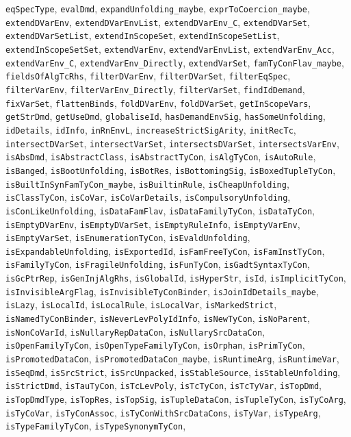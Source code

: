 \texttt{eqSpecType}, \texttt{evalDmd}, \texttt{expandUnfolding_maybe}, \texttt{exprToCoercion_maybe}, \texttt{extendDVarEnv}, \texttt{extendDVarEnvList}, \texttt{extendDVarEnv_C}, \texttt{extendDVarSet}, \texttt{extendDVarSetList}, \texttt{extendInScopeSet}, \texttt{extendInScopeSetList}, \texttt{extendInScopeSetSet}, \texttt{extendVarEnv}, \texttt{extendVarEnvList}, \texttt{extendVarEnv_Acc}, \texttt{extendVarEnv_C}, \texttt{extendVarEnv_Directly}, \texttt{extendVarSet}, \texttt{famTyConFlav_maybe}, \texttt{fieldsOfAlgTcRhs}, \texttt{filterDVarEnv}, \texttt{filterDVarSet}, \texttt{filterEqSpec}, \texttt{filterVarEnv}, \texttt{filterVarEnv_Directly}, \texttt{filterVarSet}, \texttt{findIdDemand}, \texttt{fixVarSet}, \texttt{flattenBinds}, \texttt{foldDVarEnv}, \texttt{foldDVarSet}, \texttt{getInScopeVars}, \texttt{getStrDmd}, \texttt{getUseDmd}, \texttt{globaliseId}, \texttt{hasDemandEnvSig}, \texttt{hasSomeUnfolding}, \texttt{idDetails}, \texttt{idInfo}, \texttt{inRnEnvL}, \texttt{increaseStrictSigArity}, \texttt{initRecTc}, \texttt{intersectDVarSet}, \texttt{intersectVarSet}, \texttt{intersectsDVarSet}, \texttt{intersectsVarEnv}, \texttt{isAbsDmd}, \texttt{isAbstractClass}, \texttt{isAbstractTyCon}, \texttt{isAlgTyCon}, \texttt{isAutoRule}, \texttt{isBanged}, \texttt{isBootUnfolding}, \texttt{isBotRes}, \texttt{isBottomingSig}, \texttt{isBoxedTupleTyCon}, \texttt{isBuiltInSynFamTyCon_maybe}, \texttt{isBuiltinRule}, \texttt{isCheapUnfolding}, \texttt{isClassTyCon}, \texttt{isCoVar}, \texttt{isCoVarDetails}, \texttt{isCompulsoryUnfolding}, \texttt{isConLikeUnfolding}, \texttt{isDataFamFlav}, \texttt{isDataFamilyTyCon}, \texttt{isDataTyCon}, \texttt{isEmptyDVarEnv}, \texttt{isEmptyDVarSet}, \texttt{isEmptyRuleInfo}, \texttt{isEmptyVarEnv}, \texttt{isEmptyVarSet}, \texttt{isEnumerationTyCon}, \texttt{isEvaldUnfolding}, \texttt{isExpandableUnfolding}, \texttt{isExportedId}, \texttt{isFamFreeTyCon}, \texttt{isFamInstTyCon}, \texttt{isFamilyTyCon}, \texttt{isFragileUnfolding}, \texttt{isFunTyCon}, \texttt{isGadtSyntaxTyCon}, \texttt{isGcPtrRep}, \texttt{isGenInjAlgRhs}, \texttt{isGlobalId}, \texttt{isHyperStr}, \texttt{isId}, \texttt{isImplicitTyCon}, \texttt{isInvisibleArgFlag}, \texttt{isInvisibleTyConBinder}, \texttt{isJoinIdDetails_maybe}, \texttt{isLazy}, \texttt{isLocalId}, \texttt{isLocalRule}, \texttt{isLocalVar}, \texttt{isMarkedStrict}, \texttt{isNamedTyConBinder}, \texttt{isNeverLevPolyIdInfo}, \texttt{isNewTyCon}, \texttt{isNoParent}, \texttt{isNonCoVarId}, \texttt{isNullaryRepDataCon}, \texttt{isNullarySrcDataCon}, \texttt{isOpenFamilyTyCon}, \texttt{isOpenTypeFamilyTyCon}, \texttt{isOrphan}, \texttt{isPrimTyCon}, \texttt{isPromotedDataCon}, \texttt{isPromotedDataCon_maybe}, \texttt{isRuntimeArg}, \texttt{isRuntimeVar}, \texttt{isSeqDmd}, \texttt{isSrcStrict}, \texttt{isSrcUnpacked}, \texttt{isStableSource}, \texttt{isStableUnfolding}, \texttt{isStrictDmd}, \texttt{isTauTyCon}, \texttt{isTcLevPoly}, \texttt{isTcTyCon}, \texttt{isTcTyVar}, \texttt{isTopDmd}, \texttt{isTopDmdType}, \texttt{isTopRes}, \texttt{isTopSig}, \texttt{isTupleDataCon}, \texttt{isTupleTyCon}, \texttt{isTyCoArg}, \texttt{isTyCoVar}, \texttt{isTyConAssoc}, \texttt{isTyConWithSrcDataCons}, \texttt{isTyVar}, \texttt{isTypeArg}, \texttt{isTypeFamilyTyCon}, \texttt{isTypeSynonymTyCon}, 